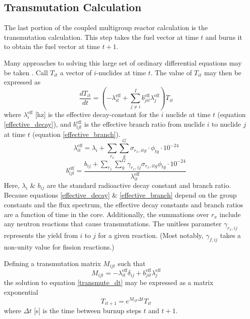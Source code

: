 \subsection{Transmutation Calculation}
\label{mg_sec:trans_calc}
The last portion of the coupled multigroup reactor calculation is the transmutation calculation.
This step takes the fuel vector at time $t$ and burns it to obtain the fuel vector at time $t+1$.

Many approaches to solving this large set of ordinary differential equations may be taken \cite{Isotalo2011}.  
Call $T_{it}$ a vector of $i$-nuclides at time $t$.  The value of $T_{it}$ may then be expressed as 
\begin{equation}
\label{transmute_dt}
\frac{dT_{it}}{dt} = \left(-\lambda_{it}^{\mbox{eff}} + \sum_{j \ne i}^I  b_{jit}^{\mbox{eff}} \lambda_j^{\mbox{eff}}\right) T_{it}
\end{equation}
where $\lambda_i^{\mbox{eff}}$ [hz] is the effective decay-constant for the $i$ nuclide at time $t$ (equation \ref{effective_decay}), 
and $b_{ijt}^{\mbox{eff}}$ is the effective branch ratio from nuclide $i$ to nuclide $j$ at time $t$ (equation \ref{effective_branch}). 
\begin{equation}
\label{effective_decay}
\lambda_{it}^{\mbox{eff}} = \lambda_i + \sum_{r_x} \sum_g^G \sigma_{r_x,itg} \cdot \phi_{tg} \cdot 10^{-24}
\end{equation}
\begin{equation}
\label{effective_branch}
b_{ijt}^{\mbox{eff}} = \frac{b_{ij} + \sum_{r_x} \sum_g^G \gamma_{r_x,ij} \sigma_{r_x,itg} \phi_{tg} \cdot 10^{-24}}
                            {\lambda_{it}^{\mbox{eff}}}
\end{equation}
Here, $\lambda_i$ \& $b_{ij}$ are the standard radioactive decay constant and branch ratio.  Because equations
\ref{effective_decay} \& \ref{effective_branch} depend on the group constants and the flux spectrum, the 
effective decay constants and branch ratios are a function of time in the core.  Additionally, the summations
over $r_x$ include any neutron reactions that cause transmutations.  The unitless parameter $\gamma_{r_x,ij}$
represents the yield from $i$ to $j$ for a given reaction.  (Most notably, $\gamma_{f,ij}$ takes a non-unity
value for fission reactions.)

Defining a transmutation matrix $M_{ijt}$ such that
\begin{equation}
\label{transmute_M}
M_{ijt} = -\lambda_{it}^{\mbox{eff}}\delta_{ij} + b_{jit}^{\mbox{eff}} \lambda_j^{\mbox{eff}}
\end{equation}
the solution to equation \ref{transmute_dt} may be expressed as a matrix exponential
\begin{equation}
\label{transmute_sol}
T_{it+1} = e^{M_{ijt}\Delta t} T_{it}
\end{equation}
where $\Delta t$ [s] is the time between burnup steps $t$ and $t+1$.

